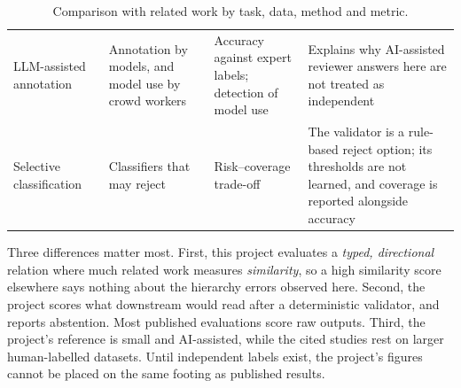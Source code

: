 \begin{table}[H]
\begin{tabularx}{\textwidth}{@{}p{2.6cm}XXX@{}}
LLM-assisted annotation~\cite{gilardi2023,veselovsky2023} & Annotation by models, and model use by crowd workers & Accuracy against expert labels; detection of model use & Explains why AI-assisted reviewer answers here are not treated as independent \\
Selective classification~\cite{chow1970,geifman2017} & Classifiers that may reject & Risk--coverage trade-off & The validator is a rule-based reject option; its thresholds are not learned, and coverage is reported alongside accuracy \\
\bottomrule
\end{tabularx}
\caption[{Comparison with related work by task, data, method and metric}]{Comparison with related work by task, data, method and metric.}
\label{tab:comparison}
\end{table}

Three differences matter most. First, this project evaluates a \emph{typed, directional} relation where much related work measures \emph{similarity}, so a high similarity score elsewhere says nothing about the hierarchy errors observed here. Second, the project scores what downstream would read after a deterministic validator, and reports abstention. Most published evaluations score raw outputs. Third, the project's reference is small and AI-assisted, while the cited studies rest on larger human-labelled datasets. Until independent labels exist, the project's figures cannot be placed on the same footing as published results.
